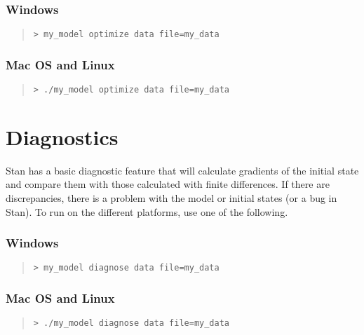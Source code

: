 \subsubsection{Windows}
%
\begin{quote}
\begin{Verbatim}[fontshape=sl]
> my_model optimize data file=my_data
\end{Verbatim}
\end{quote}

\subsubsection{Mac OS and Linux}
%
\begin{quote}
\begin{Verbatim}[fontshape=sl]
> ./my_model optimize data file=my_data
\end{Verbatim}
\end{quote}



\section{Diagnostics}\label{diagnostics.section}

Stan has a basic diagnostic feature that will calculate gradients of
the initial state and compare them with those calculated with finite
differences.  If there are discrepancies, there is a problem with the
model or initial states (or a bug in Stan).  To run on the different
platforms, use one of the following.

\subsubsection{Windows}
%
\begin{quote}
\begin{Verbatim}[fontshape=sl]
> my_model diagnose data file=my_data
\end{Verbatim}
\end{quote}

\subsubsection{Mac OS and Linux}
%
\begin{quote}
\begin{Verbatim}[fontshape=sl]
> ./my_model diagnose data file=my_data
\end{Verbatim}
\end{quote}




